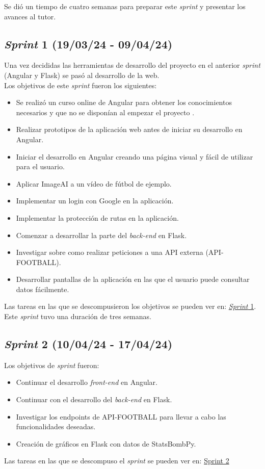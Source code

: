 Se dió un tiempo de cuatro semanas para preparar este \textit{sprint} y presentar los avances al tutor.
\subsection{\textbf{\textit{Sprint} 1 (19/03/24 - 09/04/24)}}  
Una vez decididas las herramientas de desarrollo del proyecto en el anterior \textit{sprint} (Angular y Flask) se pasó al desarrollo de la web. \\
Los objetivos de este \textit{sprint} fueron los siguientes:
\begin{itemize}
    \item Se realizó un curso online de Angular para obtener los conocimientos necesarios y que no se disponían al empezar el proyecto \cite{udemy:latex}.
    \item Realizar prototipos de la aplicación web antes de iniciar su desarrollo en Angular.
    \item Iniciar el desarrollo en Angular creando una página visual y fácil de utilizar para el usuario.
    \item Aplicar ImageAI a un vídeo de fútbol de ejemplo.
    \item Implementar un login con Google en la aplicación.
    \item Implementar la protección de rutas en la aplicación.
    \item Comenzar a desarrollar la parte del \textit{back-end} en Flask.
    \item Investigar sobre como realizar peticiones a una API externa (API-FOOTBALL).
    \item Desarrollar pantallas de la aplicación en las que el usuario puede consultar datos fácilmente.
\end{itemize}
Las tareas en las que se descompusieron los objetivos se pueden ver en: \href{https://github.com/MiguelExtremo/TFG/milestone/1?closed=1}{\textit{Sprint} 1}.
Este \textit{sprint} tuvo una duración de tres semanas.

\subsection{\textbf{\textit{Sprint} 2 (10/04/24 - 17/04/24)}} 
Los objetivos de \textit{sprint} fueron:
\begin{itemize}
    \item Continuar el desarrollo \textit{front-end} en Angular.
    \item Continuar con el desarrollo del \textit{back-end} en Flask.
    \item Investigar los endpoints de API-FOOTBALL para llevar a cabo las funcionalidades deseadas.
    \item Creación de gráficos en Flask con datos de StatsBombPy.
\end{itemize}
Las tareas en las que se descompuso el \textit{sprint} se pueden ver en: \href{https://github.com/MiguelExtremo/TFG/issues?q=is%3Aclosed+milestone%3A%22Sprint+2%22}{Sprint 2}
